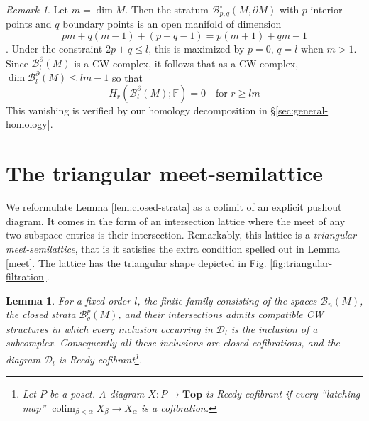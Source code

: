 \documentclass[11pt,a4paper]{article}
\numberwithin{equation}{section}
\newtheorem{lem}[thm]{Lemma}
\theoremstyle{definition}
\theoremstyle{remark}
\newtheorem{rem}[thm]{Remark}
\newcommand{\F}{\mathbb{F}}
\newcommand{\pa}{\partial}
\newcommand{\colim}{\operatorname*{colim}}
\newcommand{\BB}{\mathcal B}
\begin{document}
\begin{rem}\rm 
Let \(m=\dim M\).  Then the stratum $\BB_{p,q}^{\circ}(M,\pa M)$ with \(p\) interior points and \(q\) boundary points is an open manifold of dimension
\[
pm+q(m-1)+(p+q-1)=p(m+1)+qm-1
\].
Under the constraint \(2p+q\le l\), this is maximized by \(p=0\), \(q=l\) when $m>1$.  Since $\BB_l^\pa (M)$ is a CW complex, it follows that as a CW complex, $\dim \BB_l^{\pa}(M)\le lm-1$ so that
\begin{equation*}
H_r(\BB_l^{\pa}(M);\F)=0\quad\text{for }r\ge lm
\end{equation*}
This vanishing is verified by our homology decomposition in \S\ref{sec:general-homology}.
\end{rem}

\section{The triangular meet-semilattice}
\label{subsec:filtration-graphics}

We reformulate Lemma \ref{lem:closed-strata} as a colimit of an explicit pushout diagram.
It comes in the form of an intersection lattice where the meet of any two subspace entries is their intersection. Remarkably, this lattice is a \textit{triangular meet-semilattice}, that is it satisfies the extra condition spelled out in Lemma \ref{meet}. The lattice has the triangular shape depicted in Fig. \ref{fig:triangular-filtration}.

\begin{lem}\label{lem:compatible-triangulations}
For a fixed order \(l\), the finite family consisting of the spaces
\(\BB_n(M)\), the closed strata \(\BB_q^p(M)\), and their intersections
admits compatible CW structures in which every inclusion occurring in
\(\mathcal D_l\) is the inclusion of a subcomplex. Consequently all these
inclusions are closed cofibrations, and the diagram \(\mathcal D_l\) is Reedy
cofibrant\footnote{Let $P$ be a poset. A diagram $
X\colon P\longrightarrow \mathbf{Top}
$
is Reedy cofibrant if every ``latching map'' $\colim_{\beta<\alpha}X_\beta\rightarrow X_\alpha$ is a  cofibration.}.
\end{lem}
\end{document}
